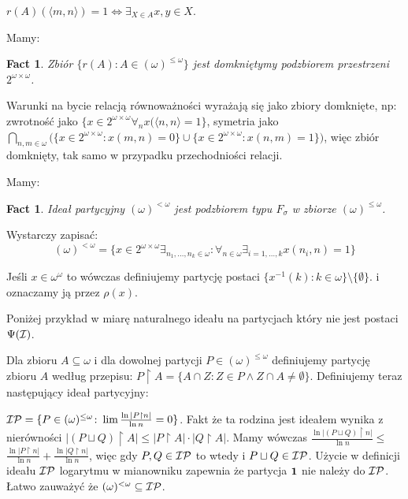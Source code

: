 \documentclass[12pt]{article}
\theoremstyle{plain}
\newtheorem{fact}[theorem]{Fact}
\theoremstyle{definition}
\theoremstyle{remark}
\newcommand{\cI}{{\cal I}}
\newcommand{\cP}{{\cal P}}
\newcommand{\Part}{(\omega)^{\leq\omega}}
\newcommand{\FinPart}{(\omega)^{<\omega}}
\begin{document}
$r(A)(\langle m,n\rangle) = 1 \iff \exists_{X\in A} x, y \in X$.

Mamy:
\begin{fact}
Zbiór $\{r(A)\colon A\in\Part\}$ jest domkniętymy podzbiorem 
przestrzeni $2^{\omega\times\omega}$.
\end{fact}
\proof
Warunki na bycie relacją równoważności wyrażają się
jako zbiory domknięte, np:
zwrotność jako $\{x\in 2^{\omega\times\omega} \forall_{n} x(\langle n, n
\rangle = 1\}$, symetria jako 
$\bigcap_{n,m\in\omega} \big(\{x\in 2^{\omega\times\omega}\colon 
x(m,n) = 0 \} \cup \{x\in 2^{\omega\times\omega} 
\colon x(n,m) = 1\}\big)$, więc zbiór domknięty, tak
samo w przypadku przechodniości relacji.

Mamy:
\begin{fact}
Ideał partycyjny $\FinPart$ jest podzbiorem
typu $F_{\sigma}$ w zbiorze $\Part$.
\end{fact}
\proof
Wystarczy zapisać:
\[\FinPart = \{
x\in 2^{\omega\times\omega}
\exists_{n_1,\ldots,n_k\in\omega}\colon
\forall_{n\in\omega} \exists_{i=1,\ldots,k}
x(n_i,n) = 1
\}\]

Jeśli $x \in \omega^\omega$ to wówczas definiujemy
partycję postaci 
$\{ x^{-1}(k)\colon k\in\omega \} \setminus \{\emptyset\}$.
i oznaczamy ją przez $\rho(x)$.

Poniżej przykład w miarę naturalnego ideału na 
partycjach który nie jest postaci $\Psi(\cI)$.

Dla zbioru $A \subseteq \omega$ i dla dowolnej
partycji $P\in\Part$ definiujemy
partycję zbioru $A$ według przepisu:
$P\restriction A = \{A \cap Z\colon
Z \in P \wedge Z\cap A \not=\emptyset\}$.
Definiujemy teraz następujący ideał
partycyjny:

$\cI\cP = \{P \in \Part\colon \lim \frac{\ln |P \restriction n|}{\ln n} = 0\}$.
Fakt że ta rodzina jest ideałem wynika z nierówności
$|(P \sqcup Q) \restriction A| \leq |P \restriction A| \cdot |Q \restriction A|$.
Mamy wówczas 
$\frac{\ln |(P \sqcup Q) \restriction n|}{\ln n} \leq $
$\frac{\ln |P \restriction n|}{\ln n} + \frac{\ln |Q \restriction n|}{\ln n}$,
więc gdy $P,Q\in\cI\cP$ to wtedy i $P \sqcup Q\in\cI\cP$.
Użycie w definicji ideału $\cI\cP$ logarytmu 
w mianowniku zapewnia że partycja ${\bf 1}$ nie
należy do $\cI\cP$.
Łatwo zauważyć że $\FinPart\subseteq \cI\cP$. 
\end{document}
